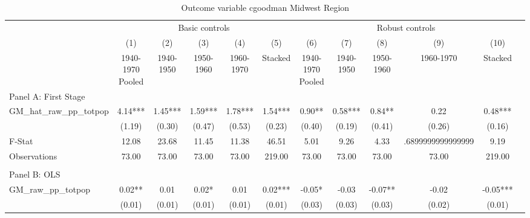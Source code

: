  \begin{table}[htbp]\centering {} \begin{threeparttable} \caption{Outcome variable cgoodman Midwest Region} \begin{tabular}{l*{11}{c}} \toprule
          &\multicolumn{5}{c}{Basic controls}                                   &\multicolumn{5}{c}{Robust controls}                                  \\\cmidrule(lr){2-6}\cmidrule(lr){7-11}
          &\multicolumn{1}{c}{(1)}&\multicolumn{1}{c}{(2)}&\multicolumn{1}{c}{(3)}&\multicolumn{1}{c}{(4)}&\multicolumn{1}{c}{(5)}&\multicolumn{1}{c}{(6)}&\multicolumn{1}{c}{(7)}&\multicolumn{1}{c}{(8)}&\multicolumn{1}{c}{(9)}&\multicolumn{1}{c}{(10)}\\
          &\multicolumn{1}{c}{1940-1970 Pooled}&\multicolumn{1}{c}{1940-1950}&\multicolumn{1}{c}{1950-1960}&\multicolumn{1}{c}{1960-1970}&\multicolumn{1}{c}{Stacked}&\multicolumn{1}{c}{1940-1970 Pooled}&\multicolumn{1}{c}{1940-1950}&\multicolumn{1}{c}{1950-1960}&\multicolumn{1}{c}{1960-1970}&\multicolumn{1}{c}{Stacked}\\
\cmidrule(lr){1-11}
\multicolumn{10}{l}{Panel A: First Stage}\\
\cmidrule(lr){1-11}
GM\_hat\_raw\_pp\_totpop&      4.14***&      1.45***&      1.59***&      1.78***&      1.54***&      0.90** &      0.58***&      0.84** &      0.22   &      0.48***\\
          &    (1.19)   &    (0.30)   &    (0.47)   &    (0.53)   &    (0.23)   &    (0.40)   &    (0.19)   &    (0.41)   &    (0.26)   &    (0.16)   \\
\midrule
F-Stat    &     12.08   &     23.68   &     11.45   &     11.38   &     46.51   &      5.01   &      9.26   &      4.33   &.6899999999999999   &      9.19   \\
Observations&     73.00   &     73.00   &     73.00   &     73.00   &    219.00   &     73.00   &     73.00   &     73.00   &     73.00   &    219.00   \\
\cmidrule[\heavyrulewidth](lr){1-11} \\ \cmidrule[\heavyrulewidth](lr){1-11}
\multicolumn{10}{l}{Panel B: OLS}\\
\cmidrule(lr){1-11}
GM\_raw\_pp\_totpop&      0.02** &      0.01   &      0.02*  &      0.01   &      0.02***&     -0.05*  &     -0.03   &     -0.07** &     -0.02   &     -0.05***\\
          &    (0.01)   &    (0.01)   &    (0.01)   &    (0.01)   &    (0.01)   &    (0.03)   &    (0.03)   &    (0.03)   &    (0.02)   &    (0.01)   \\

\end{tabular}
\end{threeparttable}
\end{table}
